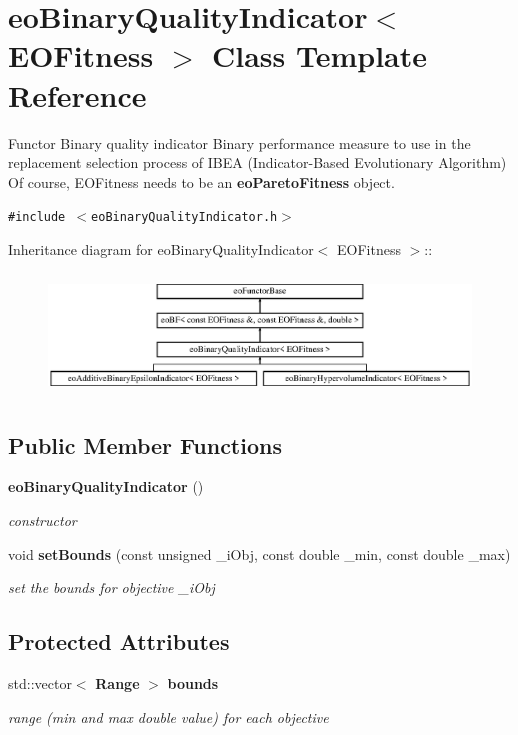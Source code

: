 \section{eo\-Binary\-Quality\-Indicator$<$ EOFitness $>$ Class Template Reference}
\label{classeoBinaryQualityIndicator}
Functor Binary quality indicator Binary performance measure to use in the replacement selection process of IBEA (Indicator-Based Evolutionary Algorithm) Of course, EOFitness needs to be an {\bf eo\-Pareto\-Fitness} object.  


{\tt \#include $<$eo\-Binary\-Quality\-Indicator.h$>$}

Inheritance diagram for eo\-Binary\-Quality\-Indicator$<$ EOFitness $>$::\begin{figure}[H]
\begin{center}
\leavevmode
\includegraphics[height=3.25581cm]{classeoBinaryQualityIndicator}
\end{center}
\end{figure}
\subsection*{Public Member Functions}
\begin{CompactItemize}
\item 
{\bf eo\-Binary\-Quality\-Indicator} ()\label{classeoBinaryQualityIndicator_e138f133fb4a5024b2e31f1544b4739a}

\begin{CompactList}\small\item\em constructor \item\end{CompactList}\item 
void {\bf set\-Bounds} (const unsigned \_\-i\-Obj, const double \_\-min, const double \_\-max)
\begin{CompactList}\small\item\em set the bounds for objective \_\-i\-Obj \item\end{CompactList}\end{CompactItemize}
\subsection*{Protected Attributes}
\begin{CompactItemize}
\item 
std::vector$<$ {\bf Range} $>$ {\bf bounds}\label{classeoBinaryQualityIndicator_aa9bb224ab744a00271577a10518581a}

\begin{CompactList}\small\item\em range (min and max double value) for each objective \item\end{CompactList}\end{CompactItemize}
